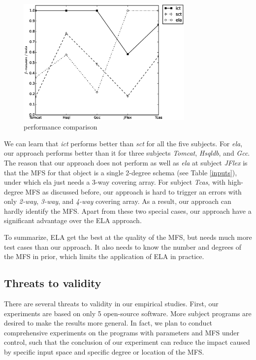 \documentclass{sig-alternate}
\begin{document}
\begin{figure}[htbp]
 \includegraphics[width=3.4in]{result.eps}
\caption{performance comparison}
\label{cm_performance}
\end{figure}

We can learn that \emph{ict} performs better than \emph{sct} for all the five subjects.  For \emph{ela}, our approach performs better than it for three subjects \emph{Tomcat}, \emph{Hsqldb}, and \emph{Gcc}. The reason that our approach does not perform as well as \emph{ela} at subject \emph{JFlex} is that the MFS for that object is a single 2-degree schema (see Table \ref{inputs}), under which ela just needs a 3-way covering array.  For subject \emph{Tcas}, with high-degree MFS as discussed before, our approach is hard to trigger an errors with only \emph{2-way}, \emph{3-way}, and \emph{4-way} covering array. As a result, our approach can hardly identify the MFS. Apart from these two special cases, our approach have a significant advantage over the ELA approach.

To summarize, ELA get the best at the quality of the MFS, but needs much more test cases than our approach.  It also needs to know the number and degrees of the MFS in prior, which limits the application of ELA in practice.
%



\subsection{Threats to validity}

There are several threats to validity in our empirical studies. First, our experiments are based on only 5 open-source software. More subject programs are desired to make the results more general. In fact, we plan to conduct comprehensive experiments on the programs with parameters and MFS under control, such that the conclusion of our experiment can reduce the impact caused by specific input space and specific degree or location of the MFS.
\end{document}

